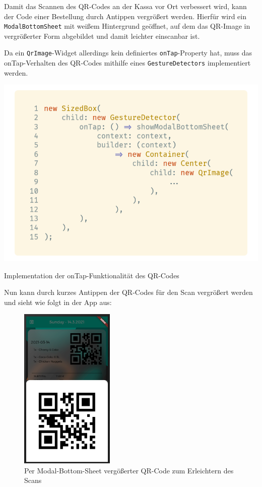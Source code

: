 Damit das Scannen des QR-Codes an der Kassa vor Ort verbessert wird, kann der Code einer Bestellung
durch Antippen vergrößert werden. Hierfür wird ein \lstinline{ModalBottomSheet} mit weißem Hintergrund
geöffnet, auf dem das QR-Image in vergrößerter Form abgebildet und damit leichter einscanbar ist.

Da ein \lstinline{QrImage}-Widget allerdings kein definiertes \lstinline{onTap}-Property hat, muss
das onTap-Verhalten des QR-Codes mithilfe eines \lstinline{GestureDetectors} implementiert werden.

\begin{code}[H]
    \centering
    \includegraphics[width=1\textwidth]{images/Client/views/orderview/gesturedetector.png}
    \vspace{-20pt}
    \caption{Implementation der onTap-Funktionalität des QR-Codes}
    \label{gesturedetector}
\end{code}

\newpage

Nun kann durch kurzes Antippen der QR-Codes für den Scan vergrößert werden und sieht wie folgt
in der App aus:

\begin{figure}[H]
    \centering
    \includegraphics[width=0.40\textwidth]{images/Client/views/orderview/qrcode.png}
    \caption{Per Modal-Bottom-Sheet vergößerter QR-Code zum Erleichtern des Scans}
\end{figure}


